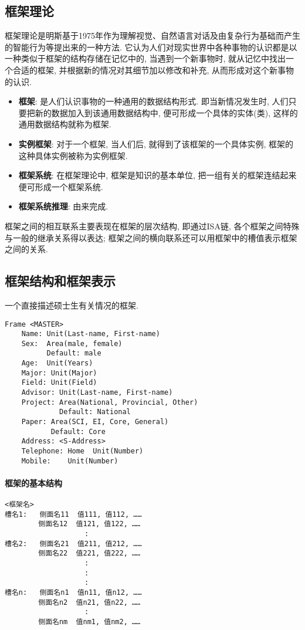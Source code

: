 \subsection{框架理论}
    框架理论是明斯基于1975年作为理解视觉、自然语言对话及由复杂行为基础而产生的智能行为等提出来的一种方法.
它认为人们对现实世界中各种事物的认识都是以一种类似于框架的结构存储在记忆中的, 当遇到一个新事物时, 就从记忆中找出一个合适的框架, 并根据新的情况对其细节加以修改和补充, 从而形成对这个新事物的认识.
\begin{itemize}
    \item \textbf{框架}: 是人们认识事物的一种通用的数据结构形式. 即当新情况发生时, 人们只要把新的数据加入到该通用数据结构中, 便可形成一个具体的实体(类), 这样的通用数据结构就称为框架.
    \item \textbf{实例框架}: 对于一个框架, 当人们后, 就得到了该框架的一个具体实例, 框架的这种具体实例被称为实例框架.
    \item \textbf{框架系统}: 在框架理论中, 框架是知识的基本单位, 把一组有关的框架连结起来便可形成一个框架系统.
    \item \textbf{框架系统推理}: 由来完成.
\end{itemize}
框架之间的相互联系主要表现在框架的层次结构, 即通过ISA链, 各个框架之间特殊与一般的继承关系得以表达;
框架之间的横向联系还可以用框架中的槽值表示框架之间的关系.
\subsection{框架结构和框架表示}
\begin{example}
一个直接描述硕士生有关情况的框架.
\end{example}
\begin{Verbatim}
Frame <MASTER>
    Name: Unit(Last-name, First-name)
    Sex:  Area(male, female)
          Default: male
    Age:  Unit(Years)
    Major: Unit(Major)
    Field: Unit(Field)
    Advisor: Unit(Last-name, First-name)
    Project: Area(National, Provincial, Other)
             Default: National
    Paper: Area(SCI, EI, Core, General)
           Default: Core
    Address: <S-Address>
    Telephone: Home  Unit(Number)
    Mobile:    Unit(Number)
\end{Verbatim}

\paragraph{框架的基本结构}
\begin{Verbatim}
<框架名>
槽名1:   侧面名11  值111, 值112, ……
        侧面名12  值121, 值122, ……
                   :
槽名2:   侧面名21  值211, 值212, ……
        侧面名22  值221, 值222, ……
                   :
                   :
                   :
槽名n:   侧面名n1  值n11, 值n12, ……
        侧面名n2  值n21, 值n22, ……
                   :
        侧面名nm  值nm1, 值nm2, ……
\end{Verbatim}

